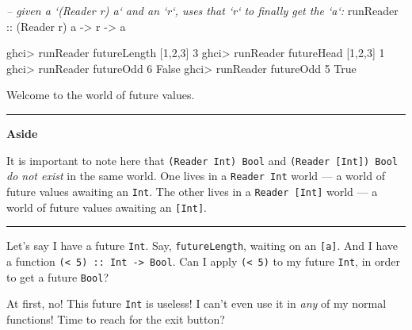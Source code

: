 \documentclass[]{article}
\newenvironment{Shaded}{}{}
\newcommand{\DataTypeTok}[1]{\textcolor[rgb]{0.56,0.13,0.00}{{#1}}}
\newcommand{\DecValTok}[1]{\textcolor[rgb]{0.25,0.63,0.44}{{#1}}}
\newcommand{\CommentTok}[1]{\textcolor[rgb]{0.38,0.63,0.69}{\textit{{#1}}}}
\newcommand{\OtherTok}[1]{\textcolor[rgb]{0.00,0.44,0.13}{{#1}}}
\newcommand{\FunctionTok}[1]{\textcolor[rgb]{0.02,0.16,0.49}{{#1}}}
\newcommand{\NormalTok}[1]{{#1}}
\begin{document}
\begin{Shaded}
\begin{Highlighting}[]
\CommentTok{-- given a `(Reader r) a` and an `r`, uses that `r` to finally get the `a`:}
\OtherTok{runReader ::} \NormalTok{(}\DataTypeTok{Reader} \NormalTok{r) a }\OtherTok{->} \NormalTok{r }\OtherTok{->} \NormalTok{a}
\end{Highlighting}
\end{Shaded}

\begin{Shaded}
\begin{Highlighting}[]
\NormalTok{ghci}\FunctionTok{>} \NormalTok{runReader futureLength [}\DecValTok{1}\NormalTok{,}\DecValTok{2}\NormalTok{,}\DecValTok{3}\NormalTok{]}
\DecValTok{3}
\NormalTok{ghci}\FunctionTok{>} \NormalTok{runReader futureHead [}\DecValTok{1}\NormalTok{,}\DecValTok{2}\NormalTok{,}\DecValTok{3}\NormalTok{]}
\DecValTok{1}
\NormalTok{ghci}\FunctionTok{>} \NormalTok{runReader futureOdd }\DecValTok{6}
\DataTypeTok{False}
\NormalTok{ghci}\FunctionTok{>} \NormalTok{runReader futureOdd }\DecValTok{5}
\DataTypeTok{True}
\end{Highlighting}
\end{Shaded}

Welcome to the world of future values.

\begin{center}\rule{0.5\linewidth}{\linethickness}\end{center}

\textbf{Aside}

It is important to note here that \texttt{(Reader\ Int)\ Bool} and
\texttt{(Reader\ {[}Int{]})\ Bool} \emph{do not exist} in the same
world. One lives in a \texttt{Reader\ Int} world --- a world of future
values awaiting an \texttt{Int}. The other lives in a
\texttt{Reader\ {[}Int{]}} world --- a world of future values awaiting
an \texttt{{[}Int{]}}.

\begin{center}\rule{0.5\linewidth}{\linethickness}\end{center}

Let's say I have a future \texttt{Int}. Say, \texttt{futureLength},
waiting on an \texttt{{[}a{]}}. And I have a function
\texttt{(\textless{}\ 5)\ ::\ Int\ -\textgreater{}\ Bool}. Can I apply
\texttt{(\textless{}\ 5)} to my future \texttt{Int}, in order to get a
future \texttt{Bool}?

At first, no! This future \texttt{Int} is useless! I can't even use it
in \emph{any} of my normal functions! Time to reach for the exit button?
\end{document}
